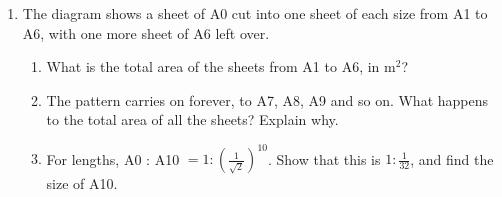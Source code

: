 \documentclass[11pt,a4paper]{article}
\begin{document}
\begin{enumerate}[resume]
\item
\begin{minipage}[t]{0.64\linewidth}
The diagram shows a sheet of A0 cut into one sheet of each size from A1 to
A6, with one more sheet of A6 left over.
\begin{enumerate}
  \item What is the total area of the sheets from A1 to A6, in m$^2$?
  \item The pattern carries on forever, to A7, A8, A9 and so on. What happens
        to the total area of all the sheets? Explain why.
  \item For lengths, A0 : A10 $=1:\left(\frac{1}{\sqrt{2}}\right)^{10}$. Show
        that this is $1:\frac{1}{32}$, and find the size of A10.
\end{enumerate}
\end{minipage}\hfill
\begin{minipage}[t]{0.33\linewidth}
\vspace{2pt}
\centering
{}
\end{minipage}


\end{enumerate}
\end{document}
